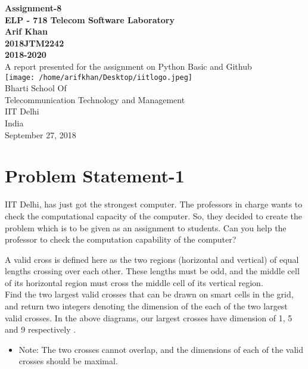 \documentclass[12pt]{article}
\begin{document}
\begin{center}
\textbf{Assignment-8 \\
\vspace{5mm}
ELP - 718 Telecom Software Laboratory \\
\vspace{2mm}
Arif Khan \\
2018JTM2242 \\
2018-2020} \\
\vspace{10mm}
A report presented for the assignment on Python Basic and Github\\
\vspace{30mm}
\texttt{[image: /home/arifkhan/Desktop/iitlogo.jpeg]} \\
\vspace{10mm}
Bharti School Of \\
Telecommunication Technology and Management \\
IIT Delhi \\
India \\
September 27, 2018
\newpage
\tableofcontents
\newpage

\end{center}
\section{Problem Statement-1} 
IIT Delhi, has just got the strongest computer. The professors in charge wants to check the computational capacity of the computer. So, they decided to create the problem which is to be given as an assignment to students. Can you help the professor to check the computation capability of the computer?

A valid cross is defined here as the two regions (horizontal and vertical) of equal lengths crossing over each other. These lengths must be odd, and the middle cell of its horizontal region must cross the middle cell of its vertical region.\\
Find the two largest valid crosses that can be drawn on smart cells in the grid, and return two integers denoting the dimension of the each of the two largest valid crosses. In the above diagrams, our largest crosses have dimension of 1,  5 and 9 respectively .
\begin{itemize}
\item  Note: The two crosses cannot overlap, and the dimensions of each of the valid crosses should be maximal.

\end{itemize}
\end{document}
